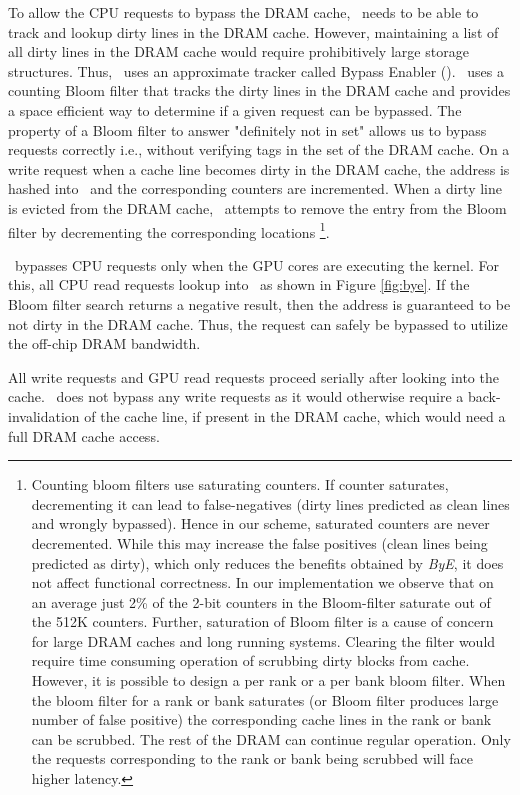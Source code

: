 \par To allow the CPU requests to bypass the DRAM cache, \cachename\ needs to be able to track and lookup dirty lines in the DRAM cache. However, maintaining a list of all dirty lines in the DRAM cache would require prohibitively large storage structures. Thus, \cachename\ uses an approximate tracker called Bypass Enabler (\bypassname). \bypassname\ uses a counting Bloom filter \cite{bloom,counting-bloom} that tracks the dirty lines in the DRAM cache and provides a space efficient way to determine if a given request can be bypassed. The property of a Bloom filter to answer "definitely not in set" allows us to bypass requests correctly i.e., without verifying tags in the set of the DRAM cache. 
On a write request when a cache line becomes dirty in the DRAM cache, the address is hashed into \bypassname\ and the corresponding counters are incremented. When a dirty line is evicted from the DRAM cache, \bypassname\ attempts to remove the entry from the Bloom filter by decrementing the corresponding locations 
\footnote{Counting bloom filters use saturating counters. If counter saturates, decrementing it can lead to false-negatives (dirty lines predicted as clean lines and wrongly bypassed). Hence in our scheme, saturated counters are never decremented.  While this may increase the false positives (clean lines being predicted as dirty), which only reduces the benefits obtained by \textit{ByE}, it does not affect functional correctness. In our implementation we observe that on an average just 2\% of the 2-bit counters in the Bloom-filter saturate out of the 512K counters. Further, saturation of Bloom filter is a cause of concern for large DRAM caches and long running systems. Clearing the filter would require time consuming operation of scrubbing dirty blocks from cache. However, it is possible to design a per rank or a per bank bloom filter. When the bloom filter for a rank or bank saturates (or Bloom filter produces large number of false positive) the corresponding cache lines in the rank or bank can be scrubbed. The rest of the DRAM can continue regular operation. Only the requests corresponding to the rank or bank being scrubbed will face higher latency.}.
\par \bypassname\ bypasses CPU requests only when the GPU cores are executing the kernel. For this, all CPU read requests lookup into \bypassname\ as shown in Figure \ref{fig:bye}. If the Bloom filter search returns a  negative result, then the address is guaranteed to be not dirty in the DRAM cache. Thus, the request can safely be bypassed to utilize the off-chip DRAM bandwidth. 
\par All write requests and GPU read requests proceed serially after looking into the cache. \bypassname\ does not bypass any write requests as it would otherwise require a back-invalidation of the cache line, if present in the DRAM cache, which would need a full DRAM cache access.

